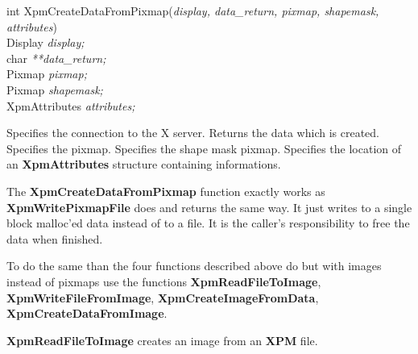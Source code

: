 \begin{flushleft}

int XpmCreateDataFromPixmap({\it display, data\_return, pixmap, shapemask,\\
\hspace{3cm}attributes})\\

\hspace{1cm}Display {\it *display;}\\
\hspace{1cm}char {\it ***data\_return;}\\
\hspace{1cm}Pixmap {\it pixmap;}\\
\hspace{1cm}Pixmap {\it shapemask;}\\
\hspace{1cm}XpmAttributes {\it *attributes;}

\end{flushleft}

\begin{description}

 Specifies the connection to the X server.
 Returns the data which is created.
 Specifies the pixmap.
 Specifies the shape mask pixmap.
 Specifies the location of an {\bf XpmAttributes} structure
containing informations.

\end{description} 

The {\bf XpmCreateDataFromPixmap} function exactly works as {\bf
Xpm\-Write\-Pixmap\-File} does and returns the same way. It just writes to a
single block malloc'ed data instead of to a file. It is the caller's
responsibility to free the data when finished.

\vspace{.5cm}
To do the same than the four functions described above do but with images
instead of pixmaps use the functions {\bf XpmReadFileToImage}, {\bf
XpmWriteFileFromImage}, {\bf XpmCreateImageFromData}, {\bf
XpmCreateDataFromImage}.

\vspace{.2cm}
{\bf XpmReadFileToImage} creates an image from an {\bf XPM} file.

